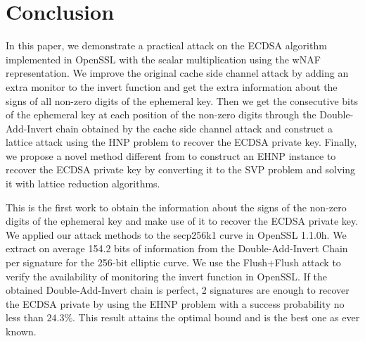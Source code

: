\section{Conclusion}
\label{sec:conclusion}
In this paper, we demonstrate a practical attack on the ECDSA algorithm implemented in OpenSSL with the scalar multiplication using the wNAF representation.
We improve the original cache side channel attack
 by adding an extra monitor to the invert function and get the extra information about the signs of all non-zero digits of the ephemeral key.
Then we get the consecutive bits of the ephemeral key at each position of the non-zero digits through the Double-Add-Invert chain obtained by the cache side channel attack and
construct a lattice attack using the HNP problem to recover the ECDSA private key.
Finally, we propose a novel method different from \cite{Fan2016} to construct an EHNP instance to recover the ECDSA private
key by converting it to the SVP problem and solving it with lattice reduction algorithms.

This is the first work to obtain the information about the signs of the non-zero digits of the ephemeral key and make use of it to recover the ECDSA private key.
We applied our attack methods to the secp256k1 curve in OpenSSL 1.1.0h.
We extract on average 154.2 bits of information from the Double-Add-Invert Chain per signature for the 256-bit elliptic curve. We use the Flush+Flush attack to verify the availability of monitoring the invert function in OpenSSL.
If the obtained Double-Add-Invert chain is perfect,
2 signatures are enough to recover the ECDSA private by using the EHNP problem with a success probability no less than $24.3\%$.
This result attains the optimal bound and is the best one as ever known.






